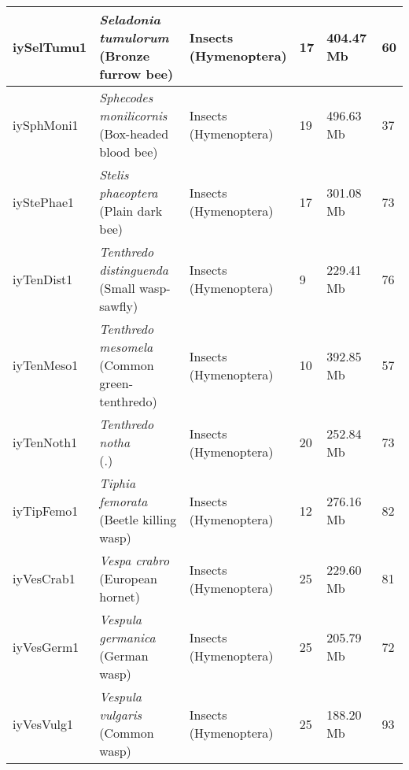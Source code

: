 \begin{centering}
\begin{longtable}{l|l|l|l|l|l}
iySelTumu1 & \makecell[{l}]{\textit{Seladonia tumulorum} \\ (Bronze furrow bee)} & \makecell[{l}]{Insects \\ (Hymenoptera)} & 17 & 404.47 Mb & 60  \\ \hline
iySphMoni1 & \makecell[{l}]{\textit{Sphecodes monilicornis} \\ (Box-headed blood bee)} & \makecell[{l}]{Insects \\ (Hymenoptera)} & 19 & 496.63 Mb & 37  \\ \hline
iyStePhae1 & \makecell[{l}]{\textit{Stelis phaeoptera} \\ (Plain dark bee)} & \makecell[{l}]{Insects \\ (Hymenoptera)} & 17 & 301.08 Mb & 73  \\ \hline
iyTenDist1 & \makecell[{l}]{\textit{Tenthredo distinguenda} \\ (Small wasp-sawfly)} & \makecell[{l}]{Insects \\ (Hymenoptera)} & 9 & 229.41 Mb & 76  \\ \hline
iyTenMeso1 & \makecell[{l}]{\textit{Tenthredo mesomela} \\ (Common green-tenthredo)} & \makecell[{l}]{Insects \\ (Hymenoptera)} & 10 & 392.85 Mb & 57  \\ \hline
iyTenNoth1 & \makecell[{l}]{\textit{Tenthredo notha} \\ (.)} & \makecell[{l}]{Insects \\ (Hymenoptera)} & 20 & 252.84 Mb & 73  \\ \hline
iyTipFemo1 & \makecell[{l}]{\textit{Tiphia femorata} \\ (Beetle killing wasp)} & \makecell[{l}]{Insects \\ (Hymenoptera)} & 12 & 276.16 Mb & 82  \\ \hline
iyVesCrab1 & \makecell[{l}]{\textit{Vespa crabro} \\ (European hornet)} & \makecell[{l}]{Insects \\ (Hymenoptera)} & 25 & 229.60 Mb & 81  \\ \hline
iyVesGerm1 & \makecell[{l}]{\textit{Vespula germanica} \\ (German wasp)} & \makecell[{l}]{Insects \\ (Hymenoptera)} & 25 & 205.79 Mb & 72  \\ \hline
iyVesVulg1 & \makecell[{l}]{\textit{Vespula vulgaris} \\ (Common wasp)} & \makecell[{l}]{Insects \\ (Hymenoptera)} & 25 & 188.20 Mb & 93  \\ \hline

\end{longtable}
\end{centering}
